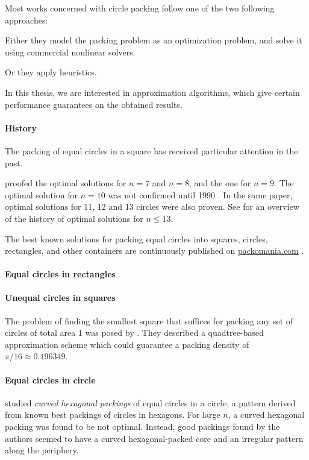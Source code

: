 Most works concerned with circle packing follow one of the two following approaches:

Either they model the packing problem as an optimization problem, and solve it using commercial nonlinear solvers.

Or they apply heuristics.

In this thesis, we are interested in approximation algorithms, which give certain performance guarantees on the obtained results.

\paragraph{History}

The packing of equal circles in a square has received particular attention in the past.

\textcite{schaer1965densest} proofed the optimal solutions for $n = 7$ and $n = 8$, and \textcite{SM1965geometric} the one for $n = 9$.
The optimal solution for $n = 10$ was not confirmed until 1990 \cite{DPW1990optimal}. In the same paper, optimal solutions for 11, 12 and 13 circles were also proven.
See \textcite{WMP1994history} for an overview of the history of optimal solutions for $n \le 13$.

The best known solutions for packing equal circles into squares, circles, rectangles, and other containers are continuously published on \url{packomania.com} \cite{specht2015packomania}.

\paragraph{Equal circles in rectangles}

\paragraph{Unequal circles in squares}

The problem of finding the smallest square that suffices for packing any set of circles of total area 1 was posed by \textcite{DFL2010circle}. They described a quadtree-based approximation scheme which could guarantee a packing density of $\pi/16 \approx 0.196349$.


\paragraph{Equal circles in circle}

\textcite{lubachevsky1997curved} studied \emph{curved hexagonal packings} of equal circles in a circle, a pattern derived from known best packings of circles in hexagons. For large $n$, a curved hexagonal packing was found to be not optimal. Instead, good packings found by the authors seemed to have a curved hexagonal-packed core and an irregular pattern along the periphery.

